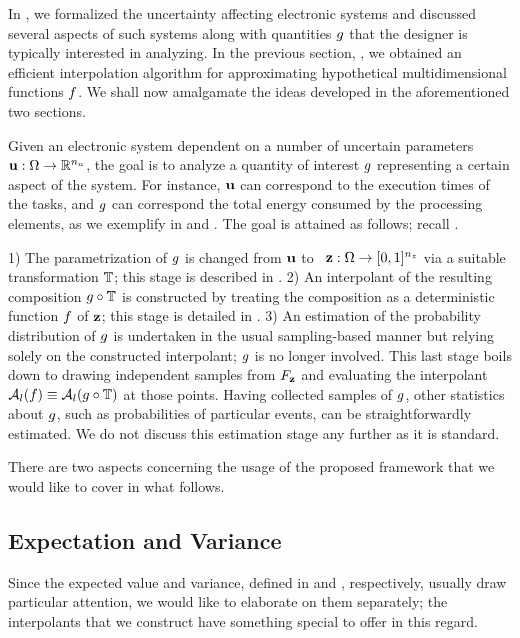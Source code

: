 In , we formalized the uncertainty affecting electronic systems
and discussed several aspects of such systems along with quantities $g$ that
the designer is typically interested in analyzing. In the previous section,
, we obtained an efficient interpolation algorithm for
approximating hypothetical multidimensional functions $f$. We shall now
amalgamate the ideas developed in the aforementioned two sections.

Given an electronic system dependent on a number of uncertain parameters $\mathbf{u}:
\Omega \to \mathbb{R}^{n_u}$, the goal is to analyze a quantity of interest $g$
representing a certain aspect of the system. For instance, $\mathbf{u}$ can correspond
to the execution times of the tasks, and $g$ can correspond the total energy
consumed by the processing elements, as we exemplify in  and
. The goal is attained as follows; recall .

1) The parametrization of $g$ is changed from $\mathbf{u}$ to \rvs\ $\mathbf{z}: \Omega
\to [0, 1]^{n_z}$ via a suitable transformation $\mathbb{T}$; this stage is
described in . 2) An interpolant of the resulting composition
$g \circ \mathbb{T}$ is constructed by treating the composition as a
deterministic function $f$ of $\mathbf{z}$; this stage is detailed in
. 3) An estimation of the probability distribution of $g$
is undertaken in the usual sampling-based manner but relying solely on the
constructed interpolant; $g$ is no longer involved. This last stage boils down
to drawing independent samples from $F_{\mathbf{z}}$ and evaluating the
interpolant $\mathcal{A}_{l}(f) \equiv \mathcal{A}_{l}(g \circ
\mathbb{T})$ at those points. Having collected samples of $g$, other
statistics about $g$, such as probabilities of particular events, can be
straightforwardly estimated. We do not discuss this estimation stage any further
as it is standard.

There are two aspects concerning the usage of the proposed framework that we
would like to cover in what follows.

\subsection{Expectation and Variance} 
Since the expected value and variance, defined in  and
, respectively, usually draw particular attention, we would like
to elaborate on them separately; the interpolants that we construct have
something special to offer in this regard.

